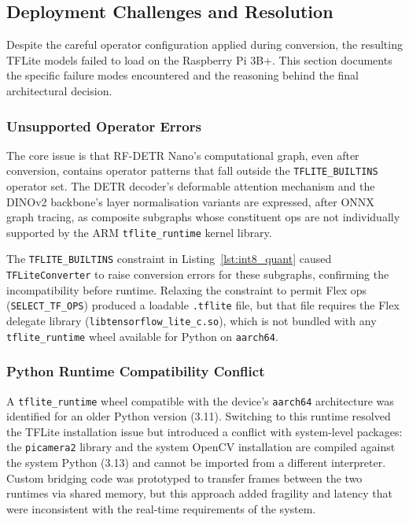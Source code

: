 \subsection{Deployment Challenges and Resolution}
\label{sec:dep_challenges_detail}

Despite the careful operator configuration applied during conversion,
the resulting TFLite models failed to load on the Raspberry Pi 3B+.
This section documents the specific failure modes encountered and the
reasoning behind the final architectural decision.

\subsubsection{Unsupported Operator Errors}

The core issue is that RF-DETR Nano's computational graph, even after
conversion, contains operator patterns that fall outside the
\texttt{TFLITE\_BUILTINS} operator set. The DETR decoder's
deformable attention mechanism and the DINOv2 backbone's layer
normalisation variants are expressed, after ONNX graph tracing, as
composite subgraphs whose constituent ops are not individually
supported by the ARM \texttt{tflite\_runtime} kernel library.

The \texttt{TFLITE\_BUILTINS} constraint in Listing~\ref{lst:int8_quant}
caused \texttt{TFLiteConverter} to raise conversion errors for these
subgraphs, confirming the incompatibility before runtime. Relaxing
the constraint to permit Flex ops (\texttt{SELECT\_TF\_OPS}) produced
a loadable \texttt{.tflite} file, but that file requires the Flex
delegate library (\texttt{libtensorflow\_lite\_c.so}), which is not
bundled with any \texttt{tflite\_runtime} wheel available for
Python on \texttt{aarch64}.

\subsubsection{Python Runtime Compatibility Conflict}

A \texttt{tflite\_runtime} wheel compatible with the device's
\texttt{aarch64} architecture was identified for an older Python
version (3.11). Switching to this runtime resolved the TFLite
installation issue but introduced a conflict with system-level
packages: the \texttt{picamera2} library and the system OpenCV
installation are compiled against the system Python (3.13) and cannot
be imported from a different interpreter. Custom bridging code was
prototyped to transfer frames between the two runtimes via shared
memory, but this approach added fragility and latency that were
inconsistent with the real-time requirements of the system.

